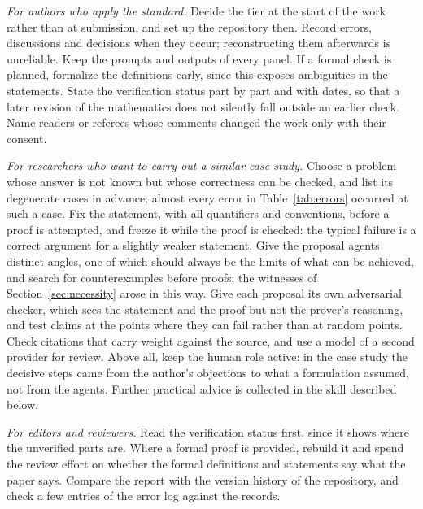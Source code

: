\emph{For authors who apply the standard.} Decide the tier at the start of the work rather than at submission, and
set up the repository then. Record errors, discussions and decisions when they occur; reconstructing them
afterwards is unreliable. Keep the prompts and outputs of every panel. If a formal check is planned, formalize the
definitions early, since this exposes ambiguities in the statements. State the verification status part by part and
with dates, so that a later revision of the mathematics does not silently fall outside an earlier check. Name readers
or referees whose comments changed the work only with their consent.

\emph{For researchers who want to carry out a similar case study.} Choose a problem whose answer is not known but
whose correctness can be checked, and list its degenerate cases in advance; almost every error in
Table~\ref{tab:errors} occurred at such a case. Fix the statement, with all quantifiers and conventions, before a
proof is attempted, and freeze it while the proof is checked: the typical failure is a correct argument for a
slightly weaker statement. Give the proposal agents distinct angles, one of which should always be the limits of what
can be achieved, and search for counterexamples before proofs; the witnesses of Section~\ref{sec:necessity} arose in
this way. Give each proposal its own adversarial checker, which sees the statement and the proof but not the
prover's reasoning, and test claims at the points where they can fail rather than at random points. Check citations
that carry weight against the source, and use a model of a second provider for review. Above all, keep the human
role active: in the case study the decisive steps came from the author's objections to what a formulation assumed,
not from the agents. Further practical advice is collected in the skill described below.

\emph{For editors and reviewers.} Read the verification status first, since it shows where the unverified parts are.
Where a formal proof is provided, rebuild it and spend the review effort on whether the formal definitions and
statements say what the paper says. Compare the report with the version history of the repository, and check a few
entries of the error log against the records.

